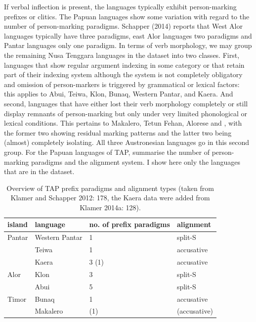 If verbal inflection is present, the languages typically exhibit person-marking prefixes or clitics. The Papuan languages show some variation with regard to the number of person-marking paradigms. Schapper (2014) reports that West Alor languages typically have three paradigms, east Alor languages two paradigms and Pantar languages only one paradigm. In terms of verb morphology, we may group the remaining Nusa Tenggara languages in the dataset into two classes. First,  languages that show regular argument indexing in some category or that retain part of their indexing system although the system is not completely obligatory and omission of person-markers is triggered by grammatical or lexical factors: this applies to Abui, Teiwa, Klon, Bunaq, Western Pantar, and Kaera. And second, languages that have either lost their verb morphology completely or still display remnants of person-marking but only under very limited phonological or lexical conditions. This pertains to Makalero, Tetun Fehan, Alorese and , with the former two showing residual marking patterns and the latter two being (almost) completely isolating. All three Austronesian languages go in this second group. For the Papuan languages of TAP, \textcite{klamer2012development} summarise the number of person-marking paradigms and the alignment system. I show here only the languages that are in the dataset.

\FloatBarrier
\begin{table}
\begin{center}
\begin{footnotesize}
\begin{tabular}{l l l l}
\hline\hline
island & language & no. of prefix paradigms & alignment \tabularnewline
\hline
Pantar & Western Pantar & 1 & split-S \tabularnewline
 & Teiwa & 1 & accusative \tabularnewline
 & Kaera & 3 (1) & accusative \tabularnewline
 Alor & Klon & 3 & split-S \tabularnewline
 & Abui & 5 & split-S \tabularnewline
 Timor & Bunaq & 1 & accusative \tabularnewline
 & Makalero & (1) & (accusative) \tabularnewline
\hline
\end{tabular}
\caption[Overview of TAP prefix paradigms and alignment types]{Overview of TAP prefix paradigms and alignment types (taken from Klamer and Schapper 2012: 178, the Kaera data were added from Klamer 2014a: 128).}
\label{table:TAPprefixalign}
\end{footnotesize}
\end{center}
\end{table}
\FloatBarrier

